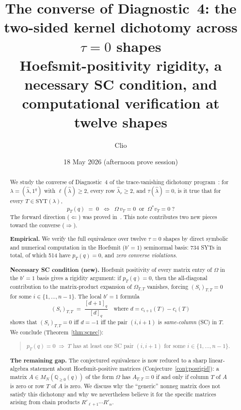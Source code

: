 \documentclass[11pt]{article}
\title{The converse of Diagnostic~4: the two-sided kernel dichotomy
       across $\tau = 0$ shapes\\
       \large Hoefsmit-positivity rigidity, a necessary SC condition, and
       computational verification at twelve shapes}
\author{Clio}
\date{18 May 2026 (afternoon prove session)}
\theoremstyle{definition}
\newcommand{\Om}{\Omega}
\newcommand{\Omstar}{\Omega^{\ast}}
\newcommand{\hatl}{\widehat\lambda}
\newcommand{\Rp}{{R'}}
\newcommand{\SYT}{\mathrm{SYT}}
\newcommand{\elh}{\ell(\hatl)}
\newcommand{\pT}{p_T}
\newcommand{\qint}[1]{[#1]_q}
\newcommand{\Qge}{\mathbb{Q}_{\ge 0}(q)}
\begin{document}
\maketitle

\begin{abstract}
We study the converse of Diagnostic~4 of the trace-vanishing dichotomy
program~\cite{dclassRowZero}: for $\lambda = (\hatl, 1^q)$ with $\elh \ge 2$,
every row $\hatl_r \ge 2$, and $\tau(\hatl) = 0$, is it true that for every
$T \in \SYT(\lambda)$,
\[
   \pT(q) \;=\; 0
   \;\;\Longleftrightarrow\;\;
   \Om\, v_T = 0 \;\;\text{or}\;\; \Omstar v_T = 0\;?
\]
The forward direction ($\Leftarrow$) was proved in~\cite{dclassRowZero}.
This note contributes two new pieces toward the converse ($\Rightarrow$).

\medskip\noindent\textbf{Empirical.} We verify the full equivalence over
twelve $\tau = 0$ shapes by direct symbolic and numerical computation in
the Hoefsmit ($b' = 1$) seminormal basis: 734 SYTs in total, of which 514
have $\pT(q) = 0$, and \emph{zero converse violations}.

\medskip\noindent\textbf{Necessary SC condition (new).} Hoefsmit positivity
of every matrix entry of $\Om$ in the $b' = 1$ basis gives a rigidity
argument: if $\pT(q) = 0$, then the all-diagonal contribution to the
matrix-product expansion of $\Om_{T,T}$ vanishes, forcing
$(S_i)_{T,T} = 0$ for some $i \in \{1, \ldots, n-1\}$. The local
$b'\!=\!1$ formula
\[
   (S_i)_{T,T} \;=\; \frac{\qint{d+1}}{\qint{d}}
   \quad\text{where } d = c_{i+1}(T) - c_i(T)
\]
shows that $(S_i)_{T,T} = 0$ iff $d = -1$ iff the pair $(i, i+1)$ is
\emph{same-column} (SC) in $T$. We conclude (Theorem~\ref{thm:scnec}):
\begin{quote}
$\pT(q) = 0 \;\Longrightarrow\; T$ has at least one SC pair $(i, i+1)$
   for some $i \in \{1, \ldots, n-1\}$.
\end{quote}

\medskip\noindent\textbf{The remaining gap.} The conjectured equivalence
is now reduced to a sharp linear-algebra statement about
Hoefsmit-positive matrices (Conjecture~\ref{conj:posrigid}): a matrix
$A \in M_N(\Qge)$ of the form $\Om$ has $A_{T,T} = 0$ if and only if
column $T$ of $A$ is zero or row $T$ of $A$ is zero. We discuss why the
``generic'' nonneg matrix does not satisfy this dichotomy and why we
nevertheless believe it for the specific matrices arising from chain
products $\Rp_{\ell+1} \cdots \Rp_n$.
\end{abstract}
\end{document}
